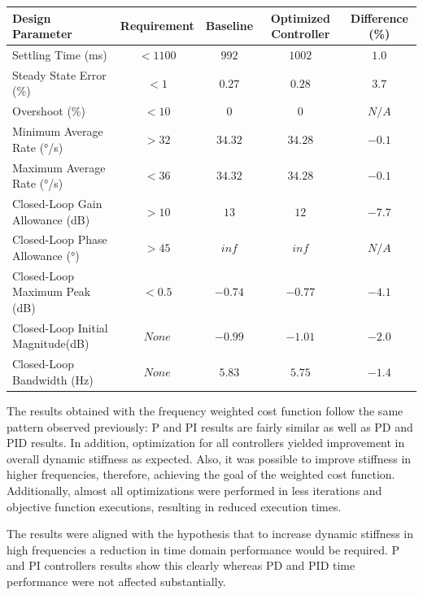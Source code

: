 \begin{table}[H]
	\label{table:5_2_4_PID_PerfTable}
	\centering
	\resizebox{14cm}{!} {
		\begin{tabular}{|l|c|c|c|c|}
			\hline
			Design Parameter & Requirement & Baseline & Optimized Controller & Difference (\%) \\ \hline
			Settling Time (ms) & $< 1100$ & $992$ & $1002$ & $1.0$ \\ \hline
			Steady State Error ($\%$) & $< 1$ & $0.27$ & $0.28$ & $3.7$ \\ \hline
			Overshoot ($\%$) & $< 10$ & $0$ & $0$ & $N/A$ \\ \hline
			Minimum Average Rate ($°$/s) & $> 32$ & $34.32$ & $34.28$ & $-0.1$ \\ \hline
			Maximum Average Rate ($°$/s) & $< 36$ & $34.32$ & $34.28$ & $-0.1$ \\ \hline
			Closed-Loop Gain Allowance (dB) & $> 10$ & $13$ & $12$ & $-7.7$ \\ \hline
			Closed-Loop Phase Allowance ($°$) & $> 45$ & $inf$ & $inf$ & $N/A$ \\ \hline
			Closed-Loop Maximum Peak (dB) & $< 0.5$ & $-0.74$ & $-0.77$ & $-4.1$ \\ \hline
			Closed-Loop Initial Magnitude(dB) & $None$ & $-0.99$ & $-1.01$ & $-2.0$ \\ \hline
			Closed-Loop Bandwidth (Hz) & $None$ & $5.83$ & $5.75$ & $-1.4$ \\ \hline
	\end{tabular}}
\end{table}

The results obtained with the frequency weighted cost function follow the same pattern observed previously: P and PI results are fairly similar as well as PD and PID results. In addition, optimization for all controllers yielded improvement in overall dynamic stiffness as expected. Also, it was possible to improve stiffness in higher frequencies, therefore, achieving the goal of the weighted cost function. Additionally, almost all optimizations were performed in less iterations and objective function executions, resulting in reduced execution times.

The results were aligned with the hypothesis that to increase dynamic stiffness in high frequencies a reduction in time domain performance would be required. P and PI controllers results show this clearly whereas PD and PID time performance were not affected substantially.

